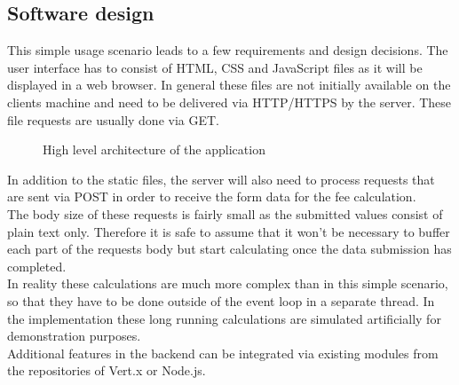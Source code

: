 




\FloatBarrier
\subsection{Software design}
\label{software_design}


This simple usage scenario leads to a few requirements and
design decisions.
The user interface has to consist of HTML, CSS and JavaScript files as it 
will be displayed in a web browser. In general these files are not initially
available on the clients machine and need to be delivered via HTTP/HTTPS by the
server. These file requests are usually done via GET.\\

\begin{figure}[h]
	\centering
	\setlength\fboxsep{2pt}
	\caption{High level architecture of the application}
	\label{fig:high_level_architecture}
\end{figure}

In addition to the static files, the server will also need to process
requests that are sent via POST in order to receive the form data for the
fee calculation.\\
The body size of these requests is fairly small as the submitted values consist
of plain text only. Therefore it is safe to assume that it won't be necessary to
buffer each part of the requests body but start calculating once the data
submission has completed.\\
In reality these calculations are much more complex than in this simple scenario,
so that they have to be done outside of the event loop in a separate thread.
In the implementation these long running calculations are simulated artificially for
demonstration purposes.\\
Additional features in the backend can be integrated via existing modules from
the repositories of Vert.x or Node.js.

